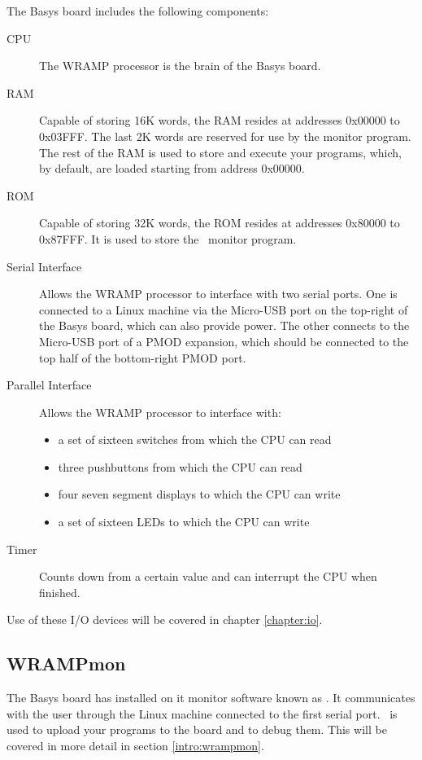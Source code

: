 The Basys board includes the following components:

\begin{description}
\item[CPU] The WRAMP processor is the brain of the Basys board.
%
\item[RAM] Capable of storing 16K words, the RAM resides at addresses 0x00000
to 0x03FFF. The last  2K words are reserved for use by the monitor program. The rest 
of the RAM is used to store and execute your programs, which, by default, are 
loaded starting from address 0x00000.
%
\item[ROM] Capable of storing 32K words, the ROM resides at addresses 
0x80000 to 0x87FFF. It is used to store the \WRAMPmon\ monitor program.
%
\item[Serial Interface] Allows the WRAMP processor to interface with two serial
ports. One is connected to a Linux machine via the Micro-USB port on the top-right
of the Basys board, which can also provide power. The other connects to the Micro-USB
port of a PMOD expansion, which should be connected to the top half of the 
bottom-right PMOD port.
%
\item[Parallel Interface] Allows the WRAMP processor to interface with: 
\begin{itemize}
\item a set of sixteen switches from which the CPU can read
\item three pushbuttons from which the CPU can read
\item four seven segment displays to which the CPU can write
\item a set of sixteen LEDs to which the CPU can write
\end{itemize}
\item[Timer] Counts down from a certain value and can interrupt the CPU when 
finished.
%
\end{description}
Use of these I/O devices will be covered in chapter \ref{chapter:io}.


\subsection{WRAMPmon}
The Basys board has installed on it monitor software known as \WRAMPmon.
It communicates with the user through the Linux machine connected to
the first serial port. \WRAMPmon\ is used to upload your programs to the
board and to debug them. This will be covered in more detail in
section \ref{intro:wrampmon}.
%
%
%
